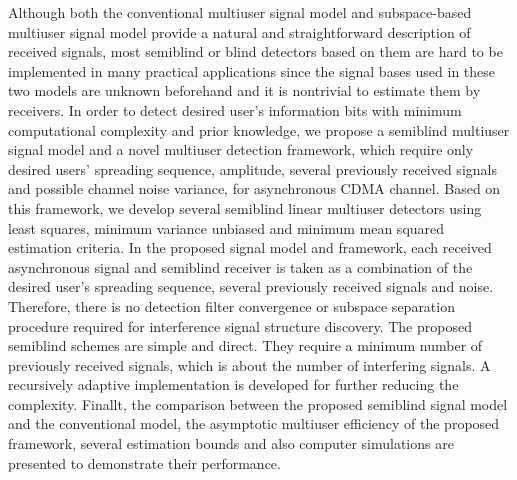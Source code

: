 \documentclass[a4paper,10pt,fleqn, twocolumn]{IEEETran}
\begin{document}
Although both the conventional multiuser signal model and
subspace-based multiuser signal model provide a natural and
straightforward description of received signals, most semiblind or
blind detectors based on them are hard to be implemented in many
practical applications since the signal bases used in these two
models are unknown beforehand and it is nontrivial to estimate
them by receivers. In order to detect desired user's information
bits with minimum computational complexity and prior knowledge, we
propose a semiblind multiuser signal model and a novel multiuser
detection framework, which require only desired users' spreading
sequence, amplitude, several previously received signals and
possible channel noise variance, for asynchronous CDMA channel.
Based on this framework, we develop several semiblind linear
multiuser detectors using least squares, minimum variance unbiased
and minimum mean squared estimation criteria. In the proposed
signal model and framework, each received asynchronous signal and
semiblind receiver is taken as a combination of the desired user's
spreading sequence, several previously received signals and noise.
Therefore, there is no detection filter convergence or subspace
separation procedure required for interference signal structure
discovery. The proposed semiblind schemes are simple and direct.
They require a minimum number of previously received signals,
which is about the number of interfering signals. A recursively
adaptive implementation is developed for further reducing the
complexity. Finallt, the comparison between the proposed semiblind
signal model and the conventional model, the asymptotic multiuser
efficiency of the proposed framework, several estimation bounds
and also computer simulations are presented to demonstrate their
performance.
\end{document}
